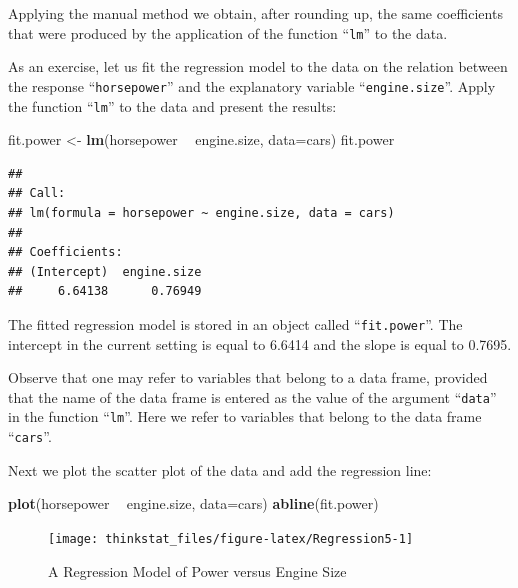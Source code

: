 \documentclass[]{krantz}
\makeatletter
\newenvironment{Shaded}{\begin{snugshade}}{\end{snugshade}}
\newcommand{\KeywordTok}[1]{\textcolor[rgb]{0.13,0.29,0.53}{\textbf{#1}}}
\newcommand{\DataTypeTok}[1]{\textcolor[rgb]{0.13,0.29,0.53}{#1}}
\newcommand{\StringTok}[1]{\textcolor[rgb]{0.31,0.60,0.02}{#1}}
\newcommand{\OperatorTok}[1]{\textcolor[rgb]{0.81,0.36,0.00}{\textbf{#1}}}
\newcommand{\NormalTok}[1]{#1}
\newenvironment{kframe}{%
\medskip{}
\setlength{\fboxsep}{.8em}
 \def\at@end@of@kframe{}%
 \ifinner\ifhmode%
  \def\at@end@of@kframe{\end{minipage}}%
  \begin{minipage}{\columnwidth}%
 \fi\fi%
 \def\FrameCommand##1{\hskip\@totalleftmargin \hskip-\fboxsep
 \colorbox{shadecolor}{##1}\hskip-\fboxsep
     \hskip-\linewidth \hskip-\@totalleftmargin \hskip\columnwidth}%
 \MakeFramed {\advance\hsize-\width
   \@totalleftmargin\z@ \linewidth\hsize
   \@setminipage}}%
 {\par\unskip\endMakeFramed%
 \at@end@of@kframe}
\renewenvironment{Shaded}{\begin{kframe}}{\end{kframe}}
\theoremstyle{definition}
\theoremstyle{definition}
\theoremstyle{definition}
\theoremstyle{remark}
\makeatother
\begin{document}
Applying the manual method we obtain, after rounding up, the same
coefficients that were produced by the application of the function
``\texttt{lm}'' to the data.

As an exercise, let us fit the regression model to the data on the
relation between the response ``\texttt{horsepower}'' and the
explanatory variable ``\texttt{engine.size}''. Apply the function
``\texttt{lm}'' to the data and present the results:

\begin{Shaded}
\begin{Highlighting}[]
\NormalTok{fit.power <-}\StringTok{ }\KeywordTok{lm}\NormalTok{(horsepower }\OperatorTok{~}\StringTok{ }\NormalTok{engine.size, }\DataTypeTok{data=}\NormalTok{cars)}
\NormalTok{fit.power}
\end{Highlighting}
\end{Shaded}

\begin{verbatim}
## 
## Call:
## lm(formula = horsepower ~ engine.size, data = cars)
## 
## Coefficients:
## (Intercept)  engine.size  
##     6.64138      0.76949
\end{verbatim}

The fitted regression model is stored in an object called
``\texttt{fit.power}''. The intercept in the current setting is equal to
6.6414 and the slope is equal to 0.7695.

Observe that one may refer to variables that belong to a data frame,
provided that the name of the data frame is entered as the value of the
argument ``\texttt{data}'' in the function ``\texttt{lm}''. Here we
refer to variables that belong to the data frame ``\texttt{cars}''.

Next we plot the scatter plot of the data and add the regression line:

\begin{Shaded}
\begin{Highlighting}[]
\KeywordTok{plot}\NormalTok{(horsepower }\OperatorTok{~}\StringTok{ }\NormalTok{engine.size, }\DataTypeTok{data=}\NormalTok{cars)}
\KeywordTok{abline}\NormalTok{(fit.power)}
\end{Highlighting}
\end{Shaded}

\begin{figure}

{\centering \texttt{[image: thinkstat\_files/figure-latex/Regression5-1]} 

}

\caption{A Regression Model of Power versus Engine Size}\label{fig:Regression5}
\end{figure}
\end{document}
